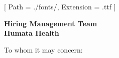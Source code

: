 


\renewcommand{\photo}[2]{}

\geometry{
  left=2cm,
  right=2cm,
  top=2cm,
  bottom=2cm
}



\makecvheader

\setmainfont{NotoSans-Regular}[
  Path = ./fonts/,
  Extension = .ttf
]

\vspace{1cm}
\indent\textbf{Hiring Management Team}\\
\indent\textbf{Humata Health}

\vspace{0.5cm}

\noindent To whom it may concern:

\vspace{0.5cm}

